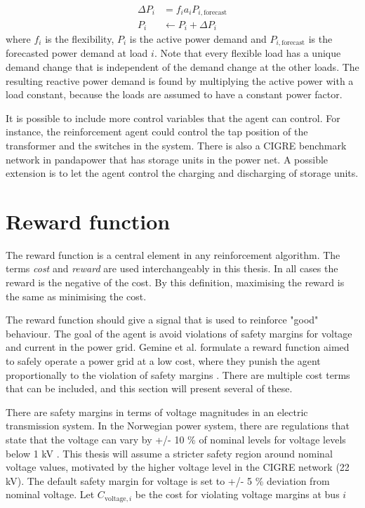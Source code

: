 \documentclass[class=book, crop=false, 11pt]{standalone}
\begin{document}
\begin{equation}
   \begin{aligned}
   \label{eq:problem:update_demand}
    \Delta P_{i}& = f_{i}a_{i}P_{i,\textrm{forecast}} \\
    P_{i}& \leftarrow P_{i} + \Delta P_{i}
    \end{aligned} 
\end{equation}
where $f_{i}$ is the flexibility, $P_{i}$ is the active power demand and $P_{i,\textrm{forecast}}$ is the forecasted power demand at load $i$. Note that every flexible load has a unique demand change that is independent of the demand change at the other loads. The resulting reactive power demand is found by multiplying the active power with a load constant, because the loads are assumed to have a constant power factor.

It is possible to include more control variables that the agent can control. For instance, the reinforcement agent could control the tap position of the transformer and the switches in the system. There is also a CIGRE benchmark network in pandapower that has storage units in the power net. A possible extension is to let the agent control the charging and discharging of storage units.

\section{Reward function}\label{section:reward}
The reward function is a central element in any reinforcement algorithm. The terms \textit{cost} and \textit{reward} are used interchangeably in this thesis. In all cases the reward is the negative of the cost. By this definition, maximising the reward is the same as minimising the cost. 

The reward function should give a signal that is used to reinforce "good" behaviour. The goal of the agent is avoid violations of safety margins for voltage and current in the power grid. Gemine et al. formulate a reward function aimed to safely operate a power grid at a low cost, where they punish the agent proportionally to the violation of safety margins \cite{active_network_management}. There are multiple cost terms that can be included, and this section will present several of these. 

There are safety margins in terms of voltage magnitudes in an electric transmission system. In the Norwegian power system, there are regulations that state that the voltage can vary by +/- 10 \% of nominal levels for voltage levels below 1 kV \cite{lovdata}. This thesis will assume a stricter safety region around nominal voltage values, motivated by the higher voltage level in the CIGRE network (22 kV). The default safety margin for voltage is set to +/- 5 \% deviation from nominal voltage. Let $C_{\textrm{voltage},i}$ be the cost for violating voltage margins at bus $i$
\end{document}

